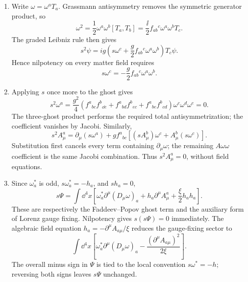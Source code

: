 \begin{enumerate}
  \begin{enumerate}
    \item[(a)]
    Write \(\omega=\omega^aT_a\).  Grassmann antisymmetry removes the
    symmetric generator product, so
    \[
      \omega^2=\frac12\omega^a\omega^b[T_a,T_b]
        =\frac{\ii}{2}f_{ab}{}^c\omega^a\omega^bT_c.
    \]
    The graded Leibniz rule then gives
    \[
      s^2\psi
       =ig\left(s\omega^c
          +\frac g2f_{ab}{}^c\omega^a\omega^b\right)T_c\psi.
    \]
    Hence nilpotency on every matter field requires
    \[
      \boxed{s\omega^c=-\frac g2f_{ab}{}^c\omega^a\omega^b.}
    \]
    \item[(b)]
    Applying \(s\) once more to the ghost gives
    \[
      s^2\omega^a
       =\frac{g^2}{4}
        \left(f^a{}_{bc}f^b{}_{\dd e}
             +f^a{}_{bd}f^b{}_{ec}
             +f^a{}_{be}f^b{}_{cd}\right)
        \omega^c\omega^d\omega^e=0.
    \]
    The three-ghost product performs the required total antisymmetrization;
    the coefficient vanishes by Jacobi.  Similarly,
    \[
      s^2A^a_\mu
       =\partial_\mu(s\omega^a)
        +gf^a{}_{bc}
          \left[(sA^b_\mu)\omega^c+A^b_\mu(s\omega^c)\right].
    \]
    Substitution first cancels every term containing
    \(\partial_\mu\omega\); the remaining \(A\omega\omega\) coefficient is
    the same Jacobi combination.  Thus \(s^2A^a_\mu=0\), without field
    equations.
    \item[(c)]
    Since \(\omega_a^*\) is odd, \(s\omega_a^*=-h_a\), and \(sh_a=0\),
    \[
      s\Psi=\int \dd^4x\left[
        \omega_a^*\partial^\mu(D_\mu\omega)_a
        +h_a\partial^\mu A^a_\mu+\frac{\xi}{2}h_ah_a\right].
    \]
    These are respectively the Faddeev--Popov ghost term and the auxiliary
    form of Lorenz gauge fixing.  Nilpotency gives \(s(s\Psi)=0\)
    immediately.  The algebraic field equation
    \(h_a=-\partial^\mu A_{a\mu}/\xi\) reduces the gauge-fixing sector to
    \[
      \int \dd^4x\left[
        \omega_a^*\partial^\mu(D_\mu\omega)_a
        -\frac{(\partial^\mu A_{a\mu})^2}{2\xi}\right].
    \]
    The overall minus sign in \(\Psi\) is tied to the local convention
    \(s\omega^*=-h\); reversing both signs leaves \(s\Psi\) unchanged.
  \end{enumerate}


\end{enumerate}
